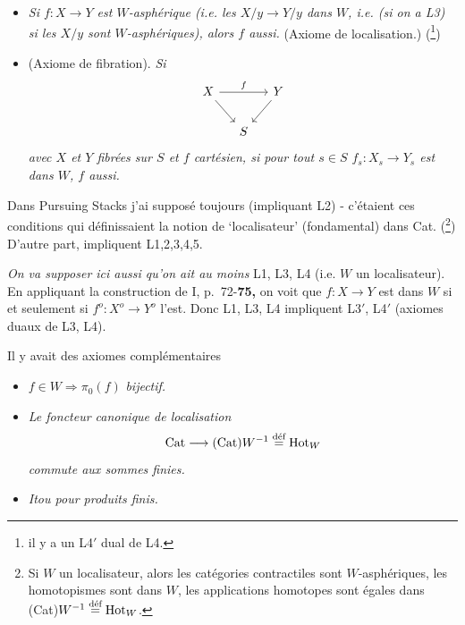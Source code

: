 \begin{itemize}[leftmargin=2.5em]
\item[\textbf{L4}] \textit{Si $f : X \longrightarrow Y$ est $W$-asphérique (i.e. les $X/y \longrightarrow Y/y$ dans $W$, i.e. (si on a L3) si les $X/y$ sont $W$-asphériques), alors $f$ aussi.} (Axiome de localisation.) (\footnote[3]{il y a un L4$'$ dual de L4.})

\item[\textbf{L5}] (Axiome de fibration). \textit{Si}
\[
\begin{tikzcd}[column sep=small]
X \arrow[rr, "f"] \arrow[dr] & & Y \arrow[dl] \\
& S &
\end{tikzcd}
\]
\textit{avec $X$ et $Y$ fibrées sur $S$ et $f$ cartésien, si pour tout $s \in S$ $f_s : X_s \longrightarrow Y_s$ est dans $W$, $f$ aussi.}
\end{itemize}

\noindent Dans Pursuing Stacks j'ai supposé toujours  (impliquant L2) - c'étaient ces conditions qui définissaient la notion de `localisateur' (fondamental) dans Cat. (\footnote[4]{Si $W$ un localisateur, alors les catégories contractiles sont $W$-asphériques, les homotopismes sont dans $W$, les applications homotopes sont égales dans (Cat)$W^{-1} \deq \mathrm{Hot}_W$.}) D'autre part,  impliquent L1,2,3,4,5.

\noindent\textit{On va supposer ici aussi qu'on ait au moins} L1, L3, L4 (i.e. $W$ un localisateur). En appliquant la construction de I, p.~72-\textbf{75,} on voit que $f : X \longrightarrow Y$ est dans $W$ si et seulement si $f^o : X^o \longrightarrow Y^o$ l'est. Donc L1, L3, L4 impliquent L3$'$, L4$'$ (axiomes duaux de L3, L4).

\noindent Il y avait des axiomes complémentaires

\begin{itemize}[leftmargin=2.5em]
\item[\textbf{La}] $f \in W \Longrightarrow \pi_0(f)$ \textit{bijectif.}

\item[\textbf{Lb}] \textit{Le foncteur canonique de localisation}
\[
\mathrm{Cat} \longrightarrow (\mathrm{Cat})W^{-1} \deq \mathrm{Hot}_W
\]
\textit{commute aux sommes finies.}

\item[\textbf{Lc}] \textit{Itou pour produits finis.}
\end{itemize}

